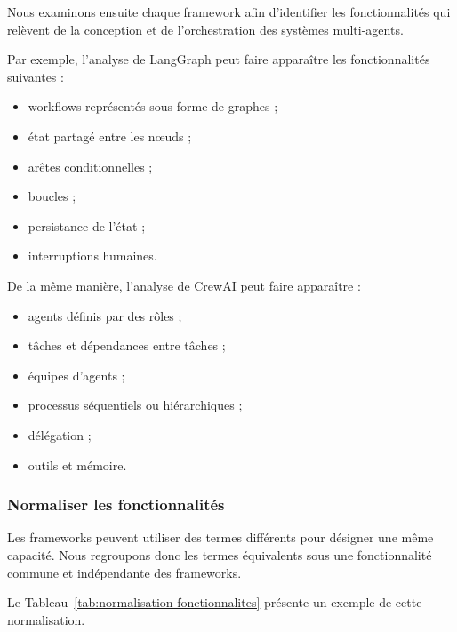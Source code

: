 Nous examinons ensuite chaque framework afin d'identifier les
fonctionnalités qui relèvent de la conception et de l'orchestration des
systèmes multi-agents.

Par exemple, l'analyse de LangGraph peut faire apparaître les
fonctionnalités suivantes :

\begin{itemize}
    \item workflows représentés sous forme de graphes ;
    \item état partagé entre les nœuds ;
    \item arêtes conditionnelles ;
    \item boucles ;
    \item persistance de l'état ;
    \item interruptions humaines.
\end{itemize}

De la même manière, l'analyse de CrewAI peut faire apparaître :

\begin{itemize}
    \item agents définis par des rôles ;
    \item tâches et dépendances entre tâches ;
    \item équipes d'agents ;
    \item processus séquentiels ou hiérarchiques ;
    \item délégation ;
    \item outils et mémoire.
\end{itemize}


\subsubsection{Normaliser les fonctionnalités}

Les frameworks peuvent utiliser des termes différents pour désigner une
même capacité. Nous regroupons donc les termes équivalents sous une
fonctionnalité commune et indépendante des frameworks.

Le Tableau~\ref{tab:normalisation-fonctionnalites} présente un exemple
de cette normalisation.

